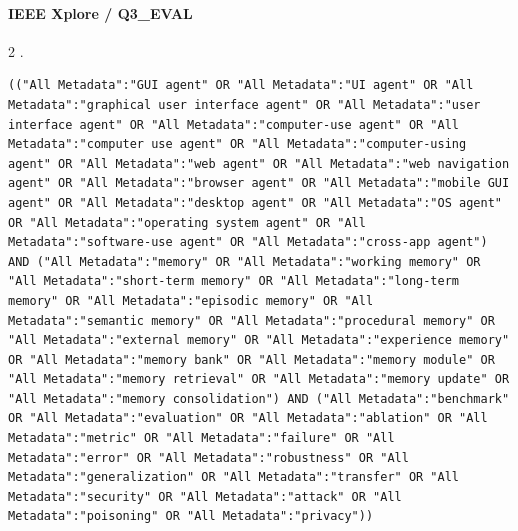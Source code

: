 \noindent\begin{minipage}{\linewidth}
\paragraph{IEEE Xplore / Q3\_EVAL}
2 .
\begin{lstlisting}
(("All Metadata":"GUI agent" OR "All Metadata":"UI agent" OR "All Metadata":"graphical user interface agent" OR "All Metadata":"user interface agent" OR "All Metadata":"computer-use agent" OR "All Metadata":"computer use agent" OR "All Metadata":"computer-using agent" OR "All Metadata":"web agent" OR "All Metadata":"web navigation agent" OR "All Metadata":"browser agent" OR "All Metadata":"mobile GUI agent" OR "All Metadata":"desktop agent" OR "All Metadata":"OS agent" OR "All Metadata":"operating system agent" OR "All Metadata":"software-use agent" OR "All Metadata":"cross-app agent") AND ("All Metadata":"memory" OR "All Metadata":"working memory" OR "All Metadata":"short-term memory" OR "All Metadata":"long-term memory" OR "All Metadata":"episodic memory" OR "All Metadata":"semantic memory" OR "All Metadata":"procedural memory" OR "All Metadata":"external memory" OR "All Metadata":"experience memory" OR "All Metadata":"memory bank" OR "All Metadata":"memory module" OR "All Metadata":"memory retrieval" OR "All Metadata":"memory update" OR "All Metadata":"memory consolidation") AND ("All Metadata":"benchmark" OR "All Metadata":"evaluation" OR "All Metadata":"ablation" OR "All Metadata":"metric" OR "All Metadata":"failure" OR "All Metadata":"error" OR "All Metadata":"robustness" OR "All Metadata":"generalization" OR "All Metadata":"transfer" OR "All Metadata":"security" OR "All Metadata":"attack" OR "All Metadata":"poisoning" OR "All Metadata":"privacy"))
\end{lstlisting}
\end{minipage}\par\medskip
